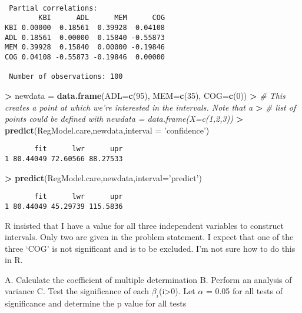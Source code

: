 \documentclass[]{article}
\newenvironment{Shaded}{\begin{snugshade}}{\end{snugshade}}
\newcommand{\KeywordTok}[1]{\textcolor[rgb]{0.13,0.29,0.53}{\textbf{#1}}}
\newcommand{\DataTypeTok}[1]{\textcolor[rgb]{0.13,0.29,0.53}{#1}}
\newcommand{\DecValTok}[1]{\textcolor[rgb]{0.00,0.00,0.81}{#1}}
\newcommand{\StringTok}[1]{\textcolor[rgb]{0.31,0.60,0.02}{#1}}
\newcommand{\CommentTok}[1]{\textcolor[rgb]{0.56,0.35,0.01}{\textit{#1}}}
\newcommand{\OperatorTok}[1]{\textcolor[rgb]{0.81,0.36,0.00}{\textbf{#1}}}
\newcommand{\ErrorTok}[1]{\textcolor[rgb]{0.64,0.00,0.00}{\textbf{#1}}}
\newcommand{\NormalTok}[1]{#1}
\begin{document}
\begin{verbatim}

 Partial correlations:
        KBI      ADL      MEM      COG
KBI 0.00000  0.18561  0.39928  0.04108
ADL 0.18561  0.00000  0.15840 -0.55873
MEM 0.39928  0.15840  0.00000 -0.19846
COG 0.04108 -0.55873 -0.19846  0.00000

 Number of observations: 100 
\end{verbatim}

\begin{Shaded}
\begin{Highlighting}[]
\OperatorTok{>}\StringTok{ }\NormalTok{newdata =}\StringTok{ }\KeywordTok{data.frame}\NormalTok{(}\DataTypeTok{ADL=}\KeywordTok{c}\NormalTok{(}\DecValTok{95}\NormalTok{), }\DataTypeTok{MEM=}\KeywordTok{c}\NormalTok{(}\DecValTok{35}\NormalTok{), }\DataTypeTok{COG=}\KeywordTok{c}\NormalTok{(}\DecValTok{0}\NormalTok{))}
\OperatorTok{>}\StringTok{ }\CommentTok{# This creates a point at which we're interested in the intervals. Note that a }
\ErrorTok{>}\StringTok{ }\CommentTok{# list of points could be defined with newdata = data.frame(X=c(1,2,3))}
\ErrorTok{>}\StringTok{ }\KeywordTok{predict}\NormalTok{(RegModel.care,newdata,}\DataTypeTok{interval =} \StringTok{'confidence'}\NormalTok{)}
\end{Highlighting}
\end{Shaded}

\begin{verbatim}
       fit      lwr      upr
1 80.44049 72.60566 88.27533
\end{verbatim}

\begin{Shaded}
\begin{Highlighting}[]
\OperatorTok{>}\StringTok{ }\KeywordTok{predict}\NormalTok{(RegModel.care,newdata,}\DataTypeTok{interval=}\StringTok{'predict'}\NormalTok{)}
\end{Highlighting}
\end{Shaded}

\begin{verbatim}
       fit      lwr      upr
1 80.44049 45.29739 115.5836
\end{verbatim}

R insisted that I have a value for all three independent variables to
construct intervals. Only two are given in the problem statement. I
expect that one of the three `COG' is not significant and is to be
excluded. I'm not sure how to do this in R.

A. Calculate the coefficient of multiple determination B. Perform an
analysis of variance C. Test the significance of each
\(\beta_i\)(i\textgreater{}0). Let \(\alpha\) = 0.05 for all tests of
significance and determine the p value for all tests
\end{document}
